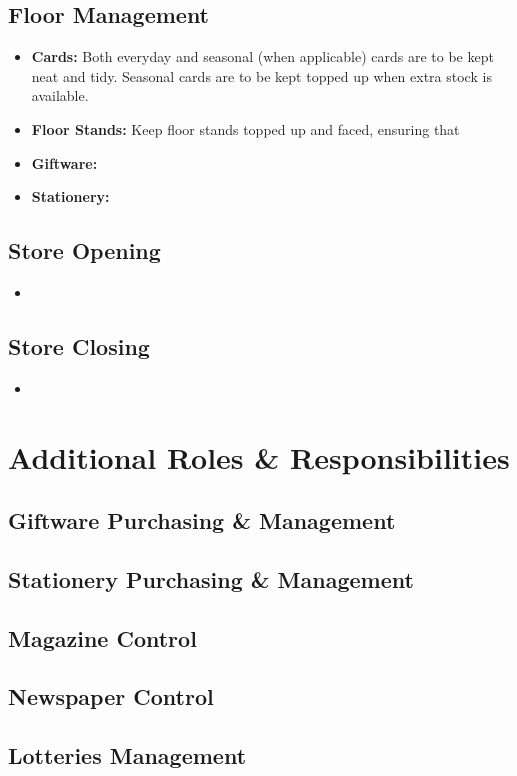 \documentclass[12pt]{article}
\begin{document}
\subsection{Floor Management}
\begin{itemize}
    \item \textbf{Cards:} Both everyday and seasonal (when applicable) cards are to be kept neat and tidy. Seasonal cards are to be kept topped up when extra stock is available.
    \item \textbf{Floor Stands:} Keep floor stands topped up and faced, ensuring that 
    \item \textbf{Giftware:}
    \item \textbf{Stationery:}
\end{itemize}

\subsection{Store Opening}
\begin{itemize}
    \item 
\end{itemize}

\subsection{Store Closing}
\begin{itemize}
    \item 
\end{itemize}

\section{Additional Roles \& Responsibilities}
\subsection{Giftware Purchasing \& Management}

\subsection{Stationery Purchasing \& Management}

\subsection{Magazine Control}

\subsection{Newspaper Control}

\subsection{Lotteries Management}
\end{document}
